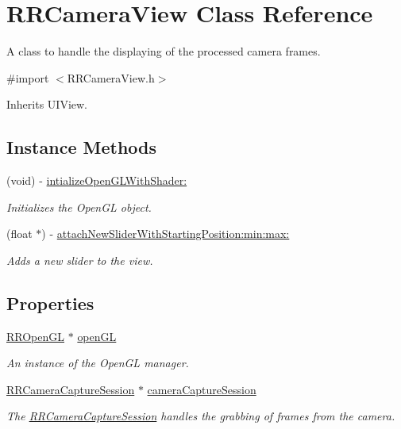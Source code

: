 \hypertarget{interface_r_r_camera_view}{\section{R\-R\-Camera\-View Class Reference}
\label{interface_r_r_camera_view}
}


A class to handle the displaying of the processed camera frames.  




{\ttfamily \#import $<$R\-R\-Camera\-View.\-h$>$}



Inherits U\-I\-View.

\subsection*{Instance Methods}
\begin{DoxyCompactItemize}
\item 
(void) -\/ \hyperlink{interface_r_r_camera_view_a9d39883afac942dd6578d5d78284c859}{intialize\-Open\-G\-L\-With\-Shader\-:}
\begin{DoxyCompactList}\small\item\em Initializes the Open\-G\-L object. \end{DoxyCompactList}\item 
(float $\ast$) -\/ \hyperlink{interface_r_r_camera_view_ab4b96ee69e2f3af645cda569642298cf}{attach\-New\-Slider\-With\-Starting\-Position\-:min\-:max\-:}
\begin{DoxyCompactList}\small\item\em Adds a new slider to the view. \end{DoxyCompactList}\end{DoxyCompactItemize}
\subsection*{Properties}
\begin{DoxyCompactItemize}
\item 
\hyperlink{interface_r_r_open_g_l}{R\-R\-Open\-G\-L} $\ast$ \hyperlink{interface_r_r_camera_view_a925a78f54a71d2cd7d06ec6a9b28a26e}{open\-G\-L}
\begin{DoxyCompactList}\small\item\em An instance of the Open\-G\-L manager. \end{DoxyCompactList}\item 
\hypertarget{interface_r_r_camera_view_a21a9845e7ed17d2bf7e50b07181c10ee}{\hyperlink{interface_r_r_camera_capture_session}{R\-R\-Camera\-Capture\-Session} $\ast$ \hyperlink{interface_r_r_camera_view_a21a9845e7ed17d2bf7e50b07181c10ee}{camera\-Capture\-Session}}\label{interface_r_r_camera_view_a21a9845e7ed17d2bf7e50b07181c10ee}

\begin{DoxyCompactList}\small\item\em The \hyperlink{interface_r_r_camera_capture_session}{R\-R\-Camera\-Capture\-Session} handles the grabbing of frames from the camera. \end{DoxyCompactList}\end{DoxyCompactItemize}


